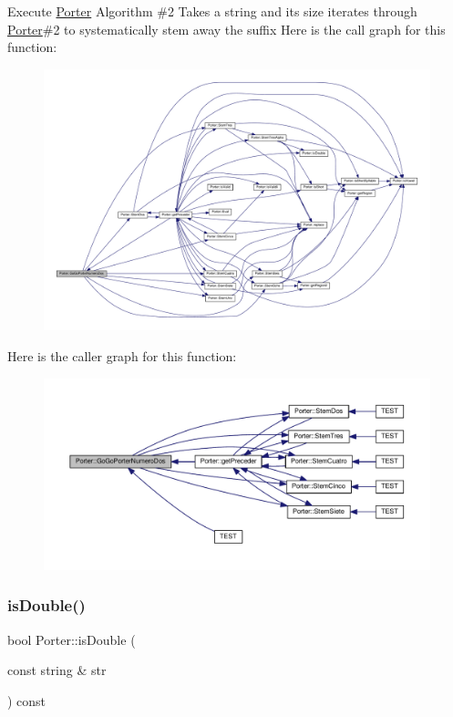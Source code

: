 Execute \hyperlink{class_porter}{Porter} Algorithm \#2 Takes a string and its size iterates through \hyperlink{class_porter}{Porter}\#2 to systematically stem away the suffix Here is the call graph for this function\+:
\nopagebreak
\begin{figure}[H]
\begin{center}
\leavevmode
\includegraphics[width=350pt]{class_porter_af7f1d6892ca1ed4e22986c48be2365d6_cgraph}
\end{center}
\end{figure}
Here is the caller graph for this function\+:
\nopagebreak
\begin{figure}[H]
\begin{center}
\leavevmode
\includegraphics[width=350pt]{class_porter_af7f1d6892ca1ed4e22986c48be2365d6_icgraph}
\end{center}
\end{figure}
\mbox{\label{class_porter_a7c8a4b3b6103ce655e8ffc8a3eba1897}} 
\subsubsection{\texorpdfstring{is\+Double()}{isDouble()}}
{\footnotesize\ttfamily bool Porter\+::is\+Double (\begin{DoxyParamCaption}\item[{const string \&}]{str }\end{DoxyParamCaption}) const}

